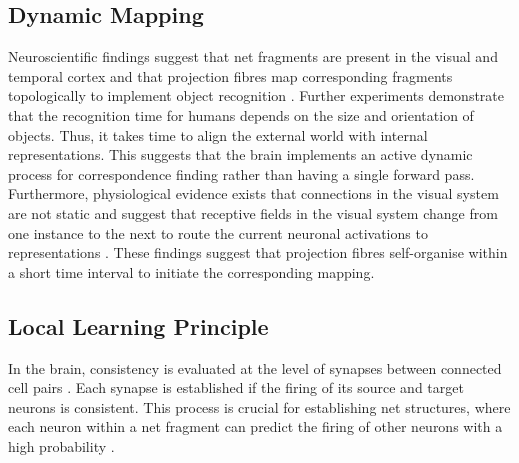 \subsection{Dynamic Mapping}
Neuroscientific findings suggest that net fragments  are present in the visual and temporal cortex and that projection fibres map corresponding fragments topologically to implement object recognition .
Further experiments demonstrate that the recognition time for humans depends on the size  and orientation  of objects. Thus, it takes time to align the external world with internal representations.
This suggests that the brain implements an active dynamic process for correspondence finding rather than having a single forward pass.
Furthermore, physiological evidence exists that connections in the visual system are not static and suggest that receptive fields in the visual system change from one instance to the next to route the current neuronal activations to representations .
These findings suggest that projection fibres self-organise within a short time interval to initiate the corresponding mapping.


\subsection{Local Learning Principle}
In the brain, consistency is evaluated at the level of synapses between connected cell pairs . Each synapse is established if the firing of its source and target neurons is consistent. This process is crucial for establishing net structures, where each neuron within a net fragment can predict the firing of other neurons with a high probability .

